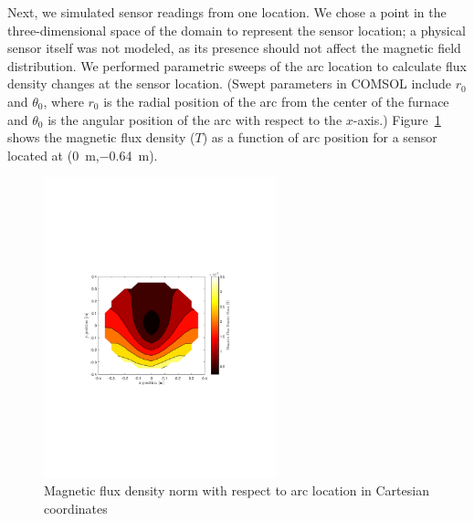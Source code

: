 \documentclass[onehalf,11pt]{beavtex}
\begin{document}
Next, we simulated sensor readings from one location.
We chose a point in the three-dimensional space of the domain to represent the sensor location; a physical sensor itself was not modeled, as its presence should not affect the magnetic field distribution.
We performed parametric sweeps of the arc location to calculate flux density changes at the sensor location. 
(Swept parameters in COMSOL include \emph{$r_0$} and $\theta_0$, where \emph{$r_0$} is the radial position of the arc from the center of the furnace and $\theta_0$ is the angular position of the arc with respect to the $x$-axis.) 
Figure~\ref{fig:large} shows the magnetic flux density ($T$) as a function of arc position for a sensor located at (\SI{0}{\meter},\SI{-0.64}{\meter}).

\begin{figure}[htbp]
\centering
\includegraphics[width=0.6\textwidth]{Bnorm2.pdf}
\caption{Magnetic flux density norm with respect to arc location in Cartesian coordinates}
\label{fig:large}
\end{figure}
\end{document}
